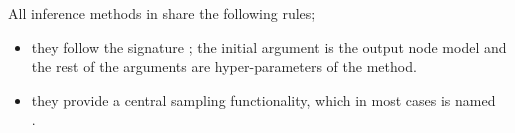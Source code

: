 
All inference methods in  share the following rules;

\begin{itemize}
\item they follow the signature ; the initial argument is the output node model and the rest
  of the arguments are hyper-parameters of the method.
\item they provide a central sampling functionality, which in most
  cases is named \\ .
\end{itemize}
